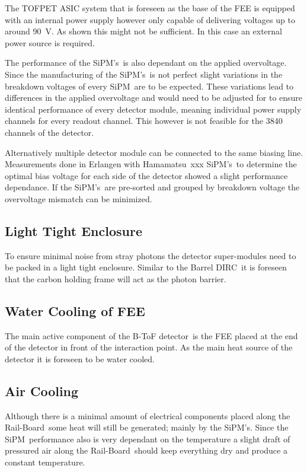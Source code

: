 \documentclass[12pt,a4paper,oneside]{article}
\newcommand{\btofD}{B-ToF detector}
\newcommand{\bdirc}{Barrel DIRC}
\newcommand{\railboard}{Rail-Board}
\newcommand{\hamamatsu}{Hamamatsu}
\newcommand{\sipm}{SiPM}
\newcommand{\sipms}{SiPM's}
\begin{document}
The TOFPET ASIC system that is foreseen as the base of the FEE is equipped with an internal power supply however only capable of delivering voltages up to around \SI{90}{V}.
As shown this might not be sufficient.
In this case an external power source is required.

The performance of the \sipms\ is also dependant on the applied overvoltage.
Since the manufacturing of the \sipms\ is not perfect slight variations in the breakdown voltages of every \sipm\ are to be expected.
These variations lead to differences in the applied overvoltage and would need to be adjusted for to ensure identical performance of every detector module, meaning individual power supply channels for every readout channel.
This however is not feasible for the 3840 channels of the detector.

Alternatively multiple detector module can be connected to the same biasing line.
Measurements done in Erlangen with \hamamatsu\ xxx \sipms\ to determine the optimal bias voltage for each side of the detector showed a slight performance dependance.
If the \sipms\ are pre-sorted and grouped by breakdown voltage the overvoltage mismatch can be minimized.

\subsection{Light Tight Enclosure}

To ensure minimal noise from stray photons the detector super-modules need to be packed in a light tight enclosure.
Similar to the \bdirc\ it is foreseen that the carbon holding frame will act as the photon barrier.

\subsection{Water Cooling of FEE}

The main active component of the \btofD\ is the FEE placed at the end of the detector in front of the interaction point. As the main heat source of the detector it is foreseen to be water cooled.

\subsection{Air Cooling}

Although there is a minimal amount of electrical components placed along the \railboard\ some heat will still be generated; mainly by the \sipms .
Since the \sipm\ performance also is very dependant on the temperature a slight draft of pressured air along the \railboard\ should keep everything dry and produce a constant temperature.
\end{document}
